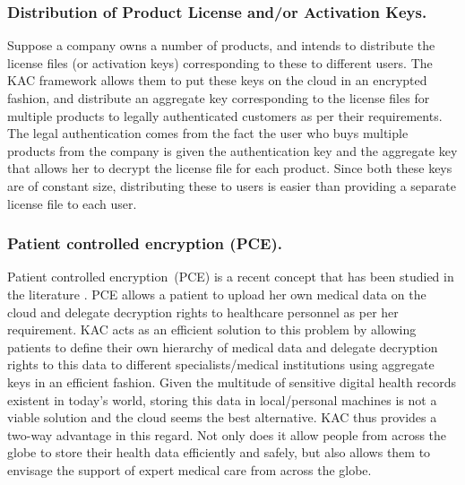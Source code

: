 \subsubsection{Distribution of Product License and/or Activation Keys.} Suppose a company owns a number of products, and intends to distribute the license files (or activation keys) corresponding to these to different users. The KAC framework allows them to put these keys on the cloud in an encrypted fashion, and distribute an aggregate key corresponding to the license files for multiple products to legally authenticated customers as per their requirements. The legal authentication comes from the fact the user who buys multiple products from the company is given the authentication key and the aggregate key that allows her to decrypt the license file for each product. Since both these keys are of constant size, distributing  these to users is easier than providing a separate license file to each user.

\subsubsection{Patient controlled encryption (PCE).} Patient controlled encryption~(PCE) is a recent concept that has been studied in the literature \cite{benaloh2009patient}. PCE allows a patient to upload her own medical data on the cloud and delegate decryption rights to healthcare personnel as per her requirement. KAC acts as an efficient solution to this problem by allowing patients to define their own hierarchy of medical data and delegate decryption rights to this data to different specialists/medical institutions using aggregate keys in an efficient fashion. Given the multitude of sensitive digital health records existent in today's world, storing this data in local/personal machines is not a viable solution and the cloud seems the best alternative. KAC thus provides a two-way advantage in this regard. Not only does it allow people from across the globe to store their health data efficiently and safely, but also allows them to envisage the support of expert medical care from across the globe. 


